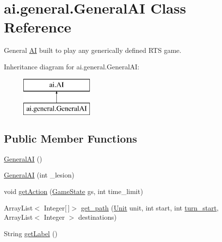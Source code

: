 \hypertarget{classai_1_1general_1_1_general_a_i}{
\section{ai.general.GeneralAI Class Reference}
\label{classai_1_1general_1_1_general_a_i}
}


General \hyperlink{classai_1_1_a_i}{AI} built to play any generically defined RTS game.  


Inheritance diagram for ai.general.GeneralAI:\begin{figure}[H]
\begin{center}
\leavevmode
\includegraphics[height=2.000000cm]{classai_1_1general_1_1_general_a_i}
\end{center}
\end{figure}
\subsection*{Public Member Functions}
\begin{DoxyCompactItemize}
\item 
\hyperlink{classai_1_1general_1_1_general_a_i_a16b2054603400bbf9ab3df3e061b4517}{GeneralAI} ()
\item 
\hyperlink{classai_1_1general_1_1_general_a_i_aa543b1b430756a330ac82a99ce4f694e}{GeneralAI} (int \_\-lesion)
\item 
void \hyperlink{classai_1_1general_1_1_general_a_i_aa25cd1f2da01ff5b29f0ec7b6fb2a633}{getAction} (\hyperlink{classrts_1_1_game_state}{GameState} gs, int time\_\-limit)
\item 
ArrayList$<$ Integer\mbox{[}$\,$\mbox{]}$>$ \hyperlink{classai_1_1general_1_1_general_a_i_ae4ef6b89b2a1195806ff2232f5468bbd}{get\_\-path} (\hyperlink{classrts_1_1units_1_1_unit}{Unit} unit, int start, int \hyperlink{classai_1_1general_1_1_general_a_i_ad2b487046bcf8f6266ea279f180b3e74}{turn\_\-start}, ArrayList$<$ Integer $>$ destinations)
\item 
String \hyperlink{classai_1_1general_1_1_general_a_i_a987c855ee333379f1d850582a9848784}{getLabel} ()
\end{DoxyCompactItemize}

